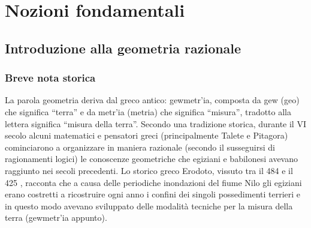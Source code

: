 % 

\chapter{Nozioni fondamentali}
\label{chap:nozioni_fondamentali}


\section{Introduzione alla geometria 
razionale}\label{sect:intro_geometria_razionale}
\subsection{Breve nota storica}
La parola geometria deriva dal greco antico: \textgreek{gewmetr'ia}, 
composta da \textgreek{gew} (geo) che significa ``terra'' e da 
\textgreek{metr'ia} (metria) che significa ``misura'', tradotto alla 
lettera significa ``misura della terra''. Secondo una tradizione 
storica, durante il VI secolo \aC{} alcuni matematici e pensatori 
greci (principalmente Talete e Pitagora) cominciarono a organizzare 
in maniera razionale (secondo il susseguirsi di ragionamenti logici) 
le conoscenze geometriche che egiziani e babilonesi avevano raggiunto 
nei secoli precedenti. Lo storico greco Erodoto, vissuto tra il 484 
\aC{} e il 425 \aC, racconta che a causa delle periodiche inondazioni 
del fiume Nilo gli egiziani erano costretti a ricostruire ogni anno i 
confini dei singoli possedimenti terrieri e in questo modo avevano 
sviluppato delle modalità tecniche per la misura della terra 
(\textgreek{gewmetr'ia} appunto).

